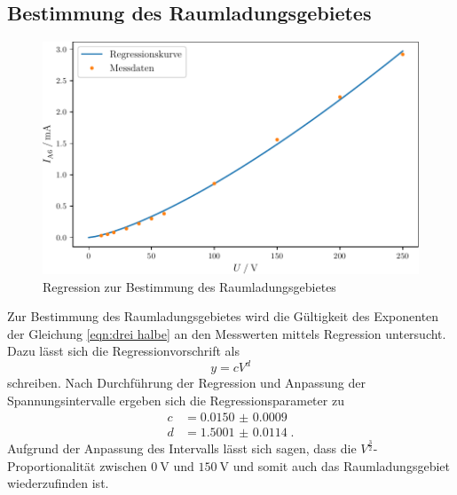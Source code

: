 \subsection{Bestimmung des Raumladungsgebietes}
\begin{figure}
    \centering
    \caption{Regression zur Bestimmung des Raumladungsgebietes}
    \label{fig:exponent}
    \includegraphics[width = \textwidth]{build/exponent.pdf}
\end{figure}
Zur Bestimmung des Raumladungsgebietes wird die Gültigkeit des Exponenten der Gleichung \eqref{eqn:drei halbe} an den Messwerten mittels Regression untersucht.
Dazu lässt sich die Regressionvorschrift als
\begin{equation}
    y = cV^d
\end{equation} 
schreiben.
Nach Durchführung der Regression und Anpassung der Spannungsintervalle ergeben sich die Regressionsparameter zu
\begin{align*}
    c & = \num{0.0150(9)} \\ 
    d & = \num{1.5001(114)} \; \text{.}
\end{align*}
Aufgrund der Anpassung des Intervalls lässt sich sagen, dass die $V^\frac{3}{2}$-Proportionalität zwischen $\SI{0}{\volt}$ und $\SI{150}{\volt}$ 
und somit auch das Raumladungsgebiet wiederzufinden ist.
